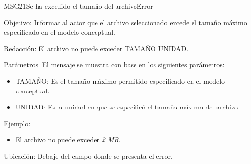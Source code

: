 \begin{mensaje}{MSG21}{Se ha excedido el tamaño del archivo}{Error}
	\item [Objetivo:] Informar al actor que el archivo seleccionado excede el tamaño máximo especificado en el modelo conceptual.
	\item[Redacción:] El archivo no puede exceder TAMAÑO UNIDAD.
	\item[Parámetros:] El mensaje se muestra con base en los siguientes parámetros:
	\begin{itemize}
		\item TAMAÑO: Es el tamaño máximo permitido especificado en el modelo conceptual.
		\item UNIDAD: Es la unidad en que se especificó el tamaño máximo del archivo.
	\end{itemize}
	\item[Ejemplo:] \begin{itemize}
		\item El archivo no puede exceder {\em 2 MB}.
	\end{itemize}
	\item [Ubicación:] Debajo del campo donde se presenta el error.
\end{mensaje}